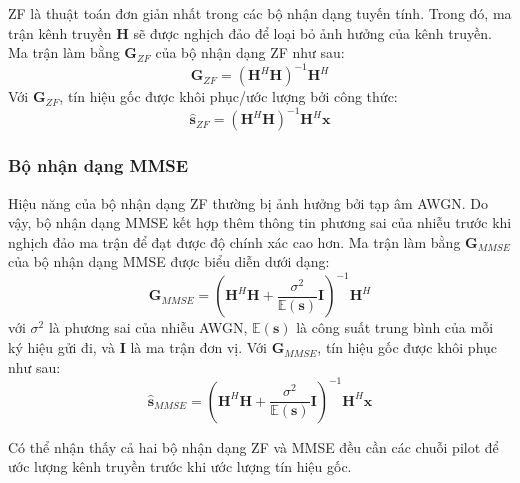 ZF là thuật toán đơn giản nhất trong các bộ nhận dạng tuyến tính. Trong đó, ma trận kênh truyền $\mathbf{H}$ sẽ được nghịch đảo để loại bỏ ảnh hưởng của kênh truyền. Ma trận làm bằng $\mathbf{G}_{ZF}$ của bộ nhận dạng ZF như sau:
\begin{equation}
    \mathbf{G}_{ZF}=\left(\mathbf{H}^H \mathbf{H}\right)^{-1} \mathbf{H}^H
\end{equation}
Với $\mathbf{G}_{ZF}$, tín hiệu gốc được khôi phục/ước lượng bởi công thức:
\begin{equation}
    \hat{\mathbf{s}}_{ZF}=\left(\mathbf{H}^H \mathbf{H}\right)^{-1} \mathbf{H}^H \mathbf{x}
\end{equation}

\subsubsection*{\textbf{Bộ nhận dạng MMSE}} \label{sec:mmse}

Hiệu năng của bộ nhận dạng ZF thường bị ảnh hưởng bởi tạp âm AWGN. Do vậy, bộ nhận dạng MMSE kết hợp thêm thông tin phương sai của nhiễu trước khi nghịch đảo ma trận để đạt được độ chính xác cao hơn. Ma trận làm bằng $\mathbf{G}_{MMSE}$ của bộ nhận dạng MMSE được biểu diễn dưới dạng:
\begin{equation}
    \mathbf{G}_{MMSE}=\left(\mathbf{H}^H \mathbf{H}+\frac{\sigma^2}{\mathbb{E}(\mathbf{s})} \mathbf{I}\right)^{-1} \mathbf{H}^H
\end{equation}
với $\sigma^2$ là phương sai của nhiễu AWGN, $\mathbb{E}(\mathbf{s})$ là công suất trung bình của mỗi ký hiệu gửi đi, và $\mathbf{I}$ là ma trận đơn vị. Với $\mathbf{G}_{MMSE}$, tín hiệu gốc được khôi phục như sau:
\begin{equation}
    \hat{\mathbf{s}}_{MMSE}=\left(\mathbf{H}^H \mathbf{H}+\frac{\sigma^2}{\mathbb{E}(\mathbf{s})} \mathbf{I}\right)^{-1} \mathbf{H}^H \mathbf{x}
\end{equation}

Có thể nhận thấy cả hai bộ nhận dạng ZF và MMSE đều cần các chuỗi pilot để ước lượng kênh truyền trước khi ước lượng tín hiệu gốc.

